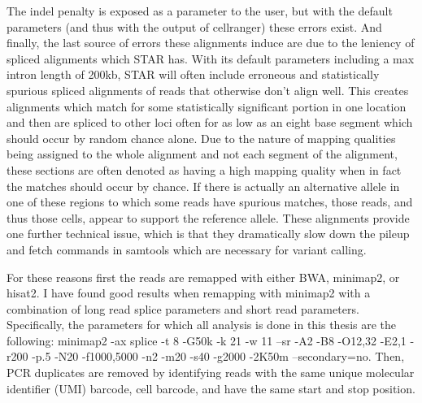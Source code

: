 \par{
The indel penalty is exposed as a parameter to the user, but with the default parameters (and thus with the output of cellranger) these errors exist. 
And finally, the last source of errors these alignments induce are due to the leniency of spliced alignments which STAR has. With its default parameters including 
a max intron length of 200kb, STAR will often include erroneous and statistically spurious spliced alignments of reads that otherwise don't align well. This creates alignments 
which match for some statistically significant portion in one location and then are spliced to other loci often for as low as an eight base segment which should occur by 
random chance alone. Due to the nature of mapping qualities being assigned to the whole alignment and not each segment of the alignment, these sections are often denoted as 
having a high mapping quality when in fact the matches should occur by chance. If there is actually an alternative allele in one of these regions to which some reads have 
spurious matches, those reads, and thus those cells, appear to support the reference allele. These alignments provide one further technical 
issue, which is that they dramatically slow down the pileup and fetch commands in samtools\cite{samtools} which are necessary for variant calling. 
} 
\par{
For these reasons first the reads are remapped with either BWA, minimap2, or hisat2. I have found good results when remapping with minimap2 with a combination 
of long read splice parameters and short read parameters. Specifically, the parameters for which all analysis is done in this thesis are the following: 
minimap2 -ax splice -t 8 -G50k -k 21 -w 11 --sr -A2 -B8 -O12,32 -E2,1 -r200 -p.5 -N20 -f1000,5000 -n2 -m20 -s40 -g2000 -2K50m --secondary=no. Then, PCR duplicates are removed by identifying reads with the same unique molecular identifier (UMI) barcode, cell barcode, and have the same start and stop position.
}


